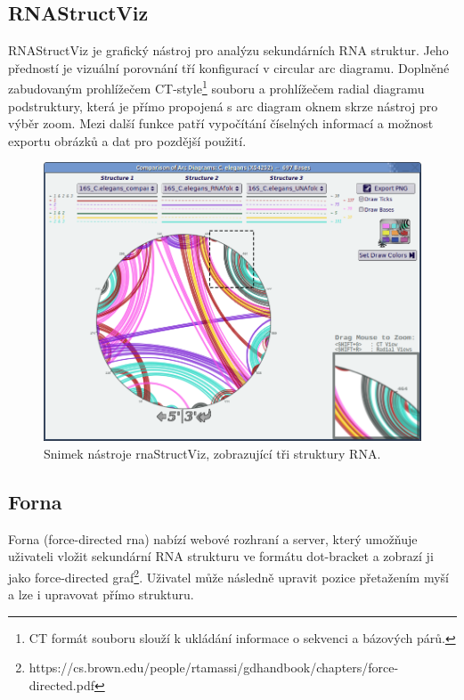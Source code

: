 \subsection{RNAStructViz} 

RNAStructViz\cite{RnaStructViz} je grafický nástroj pro analýzu sekundárních
RNA struktur. Jeho předností je vizuální porovnání tří konfigurací v circular
arc diagramu. Doplněné zabudovaným prohlížečem CT-style\footnote{CT formát
souboru slouží k ukládání informace o sekvenci a bázových párů.} souboru a
prohlížečem radial diagramu podstruktury, která je přímo propojená s arc
diagram oknem skrze nástroj pro výběr zoom. Mezi další funkce patří vypočítání
číselných informací a možnost exportu obrázků a dat pro pozdější použití.

\begin{figure}[H]
  \centering
  \includegraphics[width=140mm]{../img/kap01/tools/rnaStructViz.png}
  \caption{Snimek nástroje rnaStructViz, zobrazující tři struktury RNA.}
\end{figure}

\subsection{Forna} 

Forna\cite{Forna} (force-directed rna) nabízí webové rozhraní a server, který
umožňuje uživateli vložit sekundární RNA strukturu ve formátu dot-bracket a
zobrazí ji jako force-directed
graf\footnote{https://cs.brown.edu/people/rtamassi/gdhandbook/chapters/force-directed.pdf}.
Uživatel může následně upravit pozice přetažením myší a lze i upravovat přímo
strukturu. 

